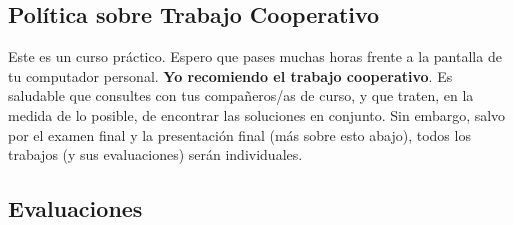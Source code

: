 \documentclass[letterpaper]{article}
\renewenvironment{itemize}{
  \begin{list}{}{
    \setlength{\leftmargin}{1.5em}
  }
}{
  \end{list}
}
\begin{document}



\subsection*{Pol\'itica sobre Trabajo Cooperativo}

Este es un curso pr\'actico. Espero que pases muchas horas frente a la pantalla de tu computador personal. {\bf Yo recomiendo el trabajo cooperativo}. Es saludable que consultes con tus compa\~neros/as de curso, y que traten, en la medida de lo posible, de encontrar las soluciones en conjunto. Sin embargo, salvo por el examen final y la presentaci\'on final (m\'as sobre esto abajo), todos los trabajos (y sus evaluaciones) ser\'an individuales.


\subsection*{Evaluaciones}
\end{document}
